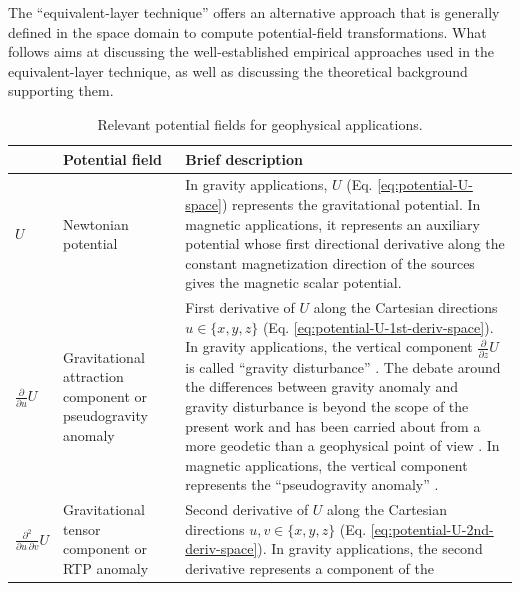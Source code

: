 The ``equivalent-layer technique'' offers an alternative approach that is generally defined in the 
space domain to compute potential-field transformations. What follows aims at discussing the well-established 
empirical approaches used in the equivalent-layer technique, as well as discussing the theoretical background 
supporting them.

\begin{table}[h]
	\caption{Relevant potential fields for geophysical applications.}
		\renewcommand{\arraystretch}{0.8}
		\begin{tabular}{%
			>{\small\centering}m{}
			>{\footnotesize\setlength{\baselineskip}{0.5\baselineskip}\centering}m{}
			>{\tiny\setlength{\baselineskip}{0.5\baselineskip}\raggedright\arraybackslash}m{}
		}
		\toprule%
		{\small \textbf{Symbol}} & 
		{\small \textbf{Potential field}} & 
		{\small \textbf{Brief description}} \\
		\midrule%
		$U$ & 
		Newtonian potential &
		In gravity applications, $U$ (Eq. \ref{eq:potential-U-space}) represents the gravitational potential. 
		In magnetic applications, it represents an auxiliary potential whose first directional derivative along the 
		constant magnetization direction of the sources gives the magnetic scalar potential. \\
		$\tfrac{\partial}{\partial u} U$ &
		Gravitational attraction component or pseudogravity anomaly &
		First derivative of $U$ along the Cartesian directions $u \in \{ x, y, z \}$ (Eq. \ref{eq:potential-U-1st-deriv-space}). 
		In gravity applications, the vertical component $\tfrac{\partial}{\partial z} U$ 
		is called ``gravity disturbance'' \citep[e.g.,][p. 93]{hofmann-wellenhof-moritz2005}. 
		The debate around the differences between gravity anomaly and gravity disturbance is beyond the scope of the 
		present work and has been carried about from a more geodetic than a geophysical point of view 
		\citep[e.g.,][]{li2001, fairhead2003, hackney-featherstone2003, hinze2005, vajda-etal2006, vajda-etal2007, vajda-etal2008}. 
		In magnetic applications, the vertical 
		component represents the ``pseudogravity anomaly'' 
		\citep[][p. 345]{blakely1996}. \\
		$\tfrac{\partial^{2}}{\partial u \, \partial v} U$ &
		Gravitational tensor component or RTP anomaly &
		Second derivative of $U$ along the Cartesian directions $u, v \in \{ x, y, z \}$ 
		(Eq. \ref{eq:potential-U-2nd-deriv-space}). 
		In gravity applications, the second derivative represents a component of the 

\end{tabular}
\end{table}
